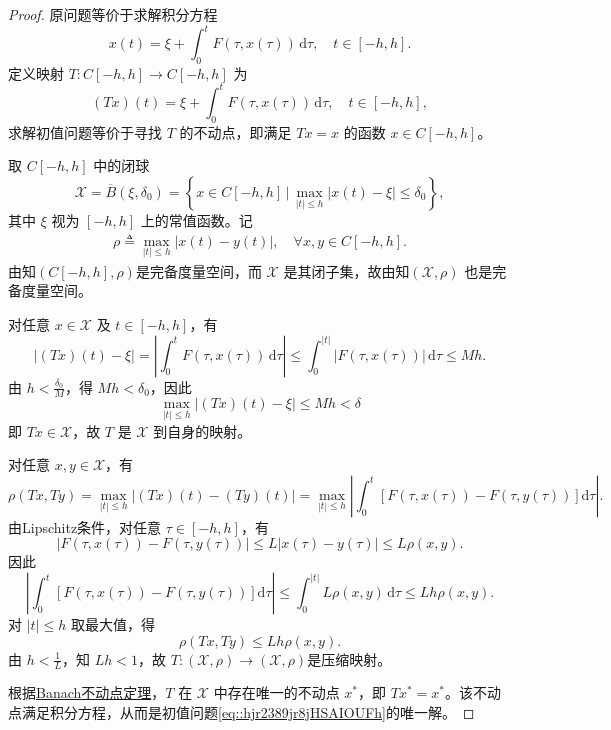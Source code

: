 \documentclass[../../main.tex]{subfiles}%
\begin{document}
\begin{proof}
原问题等价于求解积分方程
\[
x(t) = \xi + \int_0^t F(\tau, x(\tau)) \, \mathrm{d}\tau, \quad t\in[-h,h].
\]
定义映射 $T: C[-h,h] \to C[-h,h]$ 为
\[
(Tx)(t) = \xi + \int_0^t F(\tau, x(\tau)) \, \mathrm{d}\tau, \quad t\in[-h,h],
\]
求解初值问题等价于寻找 $T$ 的不动点，即满足 $Tx = x$ 的函数 $x\in C[-h,h]$。

取 $C[-h,h]$ 中的闭球
\[
\mathcal{X} = \overline{B}(\xi, \delta_0) = \left\{ x\in C[-h,h] \,\bigg|\, \max_{|t|\leqslant h} |x(t) - \xi| \leqslant \delta_0 \right\},
\]
其中 $\xi$ 视为 $[-h,h]$ 上的常值函数。记
\begin{align*}
\rho \triangleq \max_{|t|\leqslant h} \left| x(t) - y(t) \right|,\quad \forall x,y\in C[-h,h].
\end{align*}
由知$(C[-h,h],\rho)$是完备度量空间，而 $\mathcal{X}$ 是其闭子集，故由知$(\mathcal{X},\rho)$ 也是完备度量空间。

对任意 $x\in \mathcal{X}$ 及 $t\in[-h,h]$，有
\[
|(Tx)(t) - \xi| = \left| \int_0^t F(\tau, x(\tau)) \, \mathrm{d}\tau \right| \leqslant \int_0^{|t|} |F(\tau, x(\tau))| \, \mathrm{d}\tau \leqslant M h.
\]
由 $h < \frac{\delta_0}{M}$，得 $Mh < \delta_0$，因此
\[
\max_{|t|\leqslant h} |(Tx)(t) - \xi| \leqslant Mh < \delta
\]
即 $Tx\in \mathcal{X}$，故 $T$ 是 $\mathcal{X}$ 到自身的映射。

对任意 $x,y\in \mathcal{X}$，有
\[
\rho(Tx, Ty) = \max_{|t|\leqslant h} \left| (Tx)(t) - (Ty)(t) \right| = \max_{|t|\leqslant h} \left| \int_0^t \left[ F(\tau,x(\tau)) - F(\tau,y(\tau)) \right] \mathrm{d}\tau \right|.
\]
由Lipschitz条件，对任意 $\tau\in[-h,h]$，有
\[
|F(\tau,x(\tau)) - F(\tau,y(\tau))| \leqslant L |x(\tau) - y(\tau)| \leqslant L \rho(x,y).
\]
因此
\[
\left| \int_0^t \left[ F(\tau,x(\tau)) - F(\tau,y(\tau)) \right] \mathrm{d}\tau \right| \leqslant \int_0^{|t|} L \rho(x,y) \, \mathrm{d}\tau \leqslant L h \rho(x,y).
\]
对 $|t|\leqslant h$ 取最大值，得
\[
\rho(Tx, Ty) \leqslant L h \rho(x,y).
\]
由 $h < \frac{1}{L}$，知 $Lh < 1$，故 $T: (\mathcal{X},\rho)\to (\mathcal{X},\rho)$是压缩映射。

根据\hyperref[theorem:Banach不动点定理——压缩映象原理]{Banach不动点定理}，$T$ 在 $\mathcal{X}$ 中存在唯一的不动点 $x^*$，即 $Tx^* = x^*$。该不动点满足积分方程，从而是初值问题\eqref{eq::hjr2389jr8jHSAIOUFh}的唯一解。
\end{proof}
\end{document}
